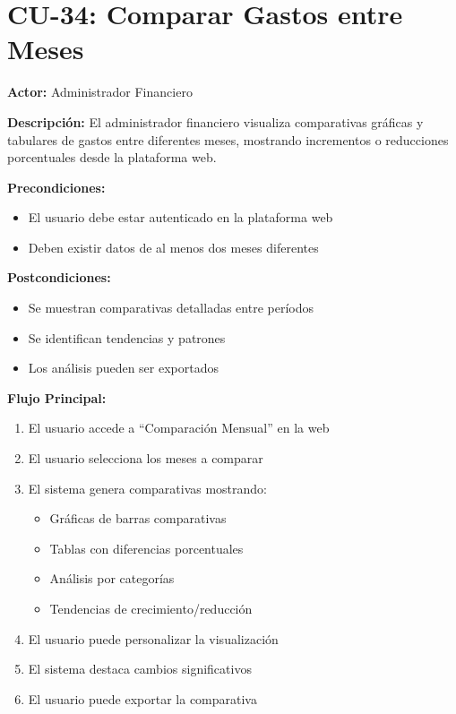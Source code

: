 \section{CU-34: Comparar Gastos entre Meses}

\noindent\textbf{Actor:} Administrador Financiero

\noindent\textbf{Descripción:} El administrador financiero visualiza comparativas gráficas y tabulares de gastos entre diferentes meses, mostrando incrementos o reducciones porcentuales desde la plataforma web.

\noindent\textbf{Precondiciones:}
\begin{itemize}
    \item El usuario debe estar autenticado en la plataforma web
    \item Deben existir datos de al menos dos meses diferentes
\end{itemize}

\noindent\textbf{Postcondiciones:}
\begin{itemize}
    \item Se muestran comparativas detalladas entre períodos
    \item Se identifican tendencias y patrones
    \item Los análisis pueden ser exportados
\end{itemize}

\noindent\textbf{Flujo Principal:}
\begin{enumerate}
    \item El usuario accede a ``Comparación Mensual'' en la web
    \item El usuario selecciona los meses a comparar
    \item El sistema genera comparativas mostrando:
    \begin{itemize}
        \item Gráficas de barras comparativas
        \item Tablas con diferencias porcentuales
        \item Análisis por categorías
        \item Tendencias de crecimiento/reducción
    \end{itemize}
    \item El usuario puede personalizar la visualización
    \item El sistema destaca cambios significativos
    \item El usuario puede exportar la comparativa
\end{enumerate}

